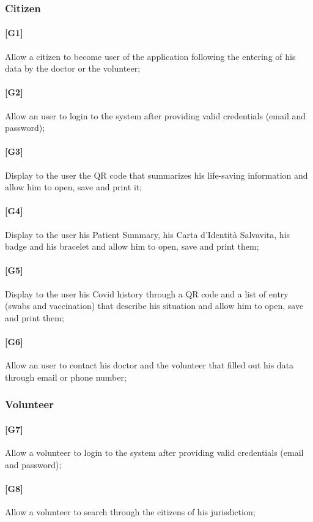 \documentclass[oneside]{book}
\begin{document}
\subsubsection{Citizen}
\paragraph{[G1]} Allow a citizen to become user of the application following the entering of his data by the doctor or the volunteer;
\paragraph{[G2]} Allow an user to login to the system after providing valid credentials (email and password);
\paragraph{[G3]} Display to the user the QR code that summarizes his life-saving information and allow him to open, save and print it;
\paragraph{[G4]} Display to the user his Patient Summary, his Carta d'Identità Salvavita, his badge and his bracelet and allow him to open, save and print them;
\paragraph{[G5]} Display to the user his Covid history through a QR code and a list of entry (swabs and vaccination) that describe his situation and allow him to open, save and print them;
\paragraph{[G6]} Allow an user to contact his doctor and the volunteer that filled out his data through email or phone number;

\subsubsection{Volunteer}
\paragraph{[G7]} Allow a volunteer to login to the system after providing valid credentials (email and password);
\paragraph{[G8]} Allow a volunteer to search through the citizens of his jurisdiction;
\end{document}

